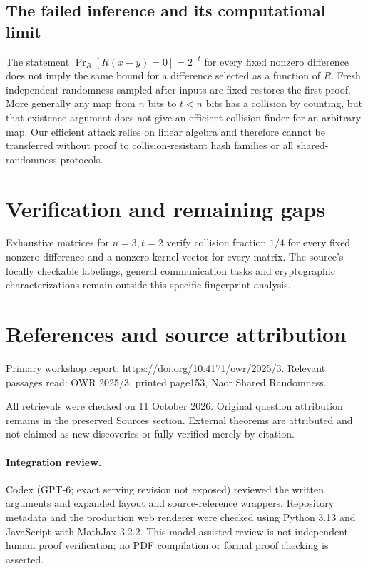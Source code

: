 \documentclass[11pt]{article}
\begin{document}
\subsection{The failed inference and its computational limit}
The statement $\Pr_R[R(x-y)=0]=2^{-t}$ for every fixed nonzero difference does not imply the same bound for a difference selected as a function of $R$. Fresh independent randomness sampled after inputs are fixed restores the first proof. More generally any map from $n$ bits to $t<n$ bits has a collision by counting, but that existence argument does not give an efficient collision finder for an arbitrary map. Our efficient attack relies on linear algebra and therefore cannot be transferred without proof to collision-resistant hash families or all shared-randomness protocols.
\section{Verification and remaining gaps}
Exhaustive matrices for $n=3,t=2$ verify collision fraction $1/4$ for every fixed nonzero difference and a nonzero kernel vector for every matrix. The source's locally checkable labelings, general communication tasks and cryptographic characterizations remain outside this specific fingerprint analysis.

\section{References and source attribution}
Primary workshop report: \url{https://doi.org/10.4171/owr/2025/3}. Relevant passages read: OWR 2025/3, printed page153, Naor Shared Randomness.

All retrievals were checked on 11 October 2026. Original question attribution remains in the preserved Sources section. External theorems are attributed and not claimed as new discoveries or fully verified merely by citation.


\paragraph{Integration review.} Codex (GPT-6; exact serving revision not exposed) reviewed the written arguments and expanded layout and source-reference wrappers. Repository metadata and the production web renderer were checked using Python 3.13 and JavaScript with MathJax 3.2.2. This model-assisted review is not independent human proof verification; no PDF compilation or formal proof checking is asserted.
\end{document}
